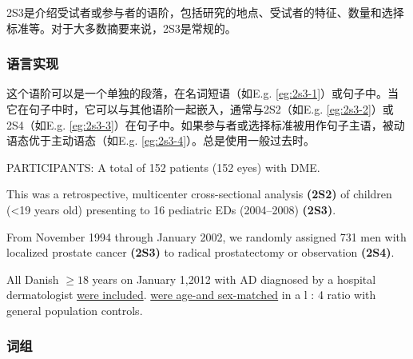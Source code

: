 \documentclass[a4paper]{ctexbook}
\begin{document}
    2S3是介绍受试者或参与者的语阶，包括研究的地点、受试者的特征、数量和选择标准等。对于大多数摘要来说，2S3是常规的。

    \subsubsection{语言实现}

    这个语阶可以是一个单独的段落，在名词短语（如E.g. \ref{eg:2s3-1}）或句子中。当它在句子中时，它可以与其他语阶一起嵌入，通常与2S2（如E.g. \ref{eg:2s3-2}）或2S4（如E.g. \ref{eg:2s3-3}）在句子中。如果参与者或选择标准被用作句子主语，被动语态优于主动语态（如E.g. \ref{eg:2s3-4}）。总是使用一般过去时。

    \begin{eg}[label={eg:2s3-1}]{}
      PARTICIPANTS: A total of 152 patients (152 eyes) with DME.
    \end{eg}

    \begin{eg}[label={eg:2s3-2}]{}
      This was a retrospective, multicenter cross-sectional analysis \textbf{(2S2)} of children (<19 years old) presenting to 16 pediatric EDs (2004--2008) \textbf{(2S3)}.
    \end{eg}

    \begin{eg}[label={eg:2s3-3}]{}
      From November 1994 through January 2002, we randomly assigned 731 men with localized prostate cancer \textbf{(2S3)} to radical prostatectomy or observation \textbf{(2S4)}.
    \end{eg}

    \begin{eg}[label={eg:2s3-4}]{}
      All Danish  $\geqslant 18$ years on January 1,2012 with AD diagnosed by a hospital dermatologist \uline{were included}.  \uline{were age-and sex-matched} in a l : 4 ratio with general population controls.
    \end{eg}

    \subsubsection{词组}
\end{document}
